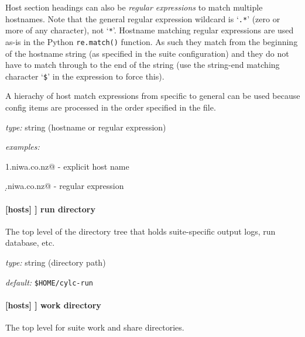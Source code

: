 Host section headings can also be {\em regular expressions} to match
multiple hostnames.  Note that the general regular expression wildcard
is `\lstinline=.*=' (zero or more of any character), not
`\lstinline=*='.
Hostname matching regular expressions are used as-is in the Python
\lstinline=re.match()= function. As such they match from the beginning
of the hostname string (as specified in the suite configuration) and they
do not have to match through to the end of the string (use the
string-end matching character `\lstinline=$=' in the expression to
force this).

A hierachy of host match expressions from specific to general can be
used because config items are processed in the order specified in the
file.

\begin{myitemize}
\item {\em type:} string (hostname or regular expression)
\item {\em examples:}
\begin{myitemize}
    \item \lstinline@server1.niwa.co.nz@ - explicit host name
    \item  \lstinline@server\d.niwa.co.nz@ - regular expression
\end{myitemize}
\end{myitemize}

\paragraph[run directory]{[hosts] \textrightarrow [[HOST]] \textrightarrow run directory }

The top level of the directory tree that holds suite-specific output logs,
run database, etc.

\begin{myitemize}
\item {\em type:} string (directory path)
\item {\em default:} \lstinline=$HOME/cylc-run=
\end{myitemize}

\paragraph[work directory]{[hosts] \textrightarrow [[HOST]] \textrightarrow work directory }
\label{workdirectory}

The top level for suite work and share directories.



